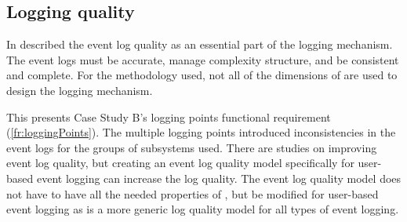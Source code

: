 \subsection{Logging quality}
In  described the event log quality as an essential part of the logging mechanism. The event logs must be accurate, manage complexity structure, and be consistent and complete. For the methodology used, not all of the dimensions of  are used to design the logging mechanism.\par This presents Case Study B's logging points functional requirement (\ref{fr:loggingPoints}). The multiple logging points introduced inconsistencies in the event logs for the groups of subsystems used. There are studies on improving event log quality, but creating an event log quality model specifically for user-based event logging can increase the log quality. The event log quality model does not have to have all the needed properties of , but be modified for user-based event logging as  is a more generic log quality model for all types of event logging.

